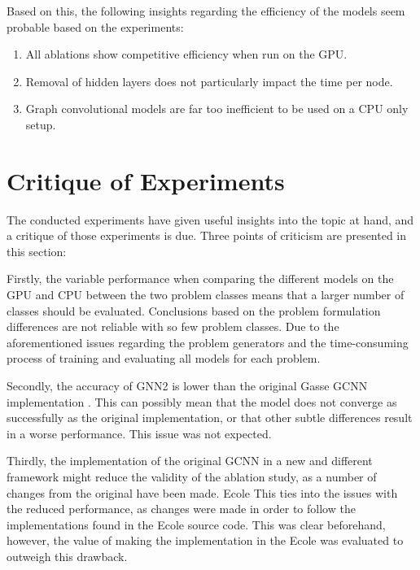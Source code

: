 Based on this, the following insights regarding the efficiency of the models seem probable based on the experiments:
\begin{enumerate}[label=(\roman*)]
    \item All ablations show competitive efficiency when run on the \gls{GPU}.
    \item Removal of hidden layers does not particularly impact the time per node.
    \item Graph convolutional models are far too inefficient to be used on a \gls{CPU} only setup. 
\end{enumerate}






\section{Critique of Experiments}

The conducted experiments have given useful insights into the topic at hand, and a critique of those experiments is due. Three points of criticism are presented in this section:


Firstly, the variable performance when comparing the different models on the \gls{GPU} and \gls{CPU} between the two problem classes means that a larger number of classes should be evaluated. Conclusions based on the problem formulation differences are not reliable with so few problem classes. Due to the aforementioned issues regarding the problem generators and the time-consuming process of training and evaluating all models for each problem. 

Secondly, the accuracy of GNN2 is lower than the original Gasse \gls{GCNN} implementation \cite{gasse2019exact}. This can possibly mean that the model does not converge as successfully as the original implementation, or that other subtle differences result in a worse performance. This issue was not expected. 

Thirdly, the implementation of the original \gls{GCNN} in a new and different framework might reduce the validity of the ablation study, as a number of changes from the original have been made.
\gls{Ecole} This ties into the issues with the reduced performance, as changes were made in order to follow the implementations found in the \gls{Ecole} source code. This was clear beforehand, however, the value of making the implementation in the \gls{Ecole} was evaluated to outweigh this drawback.



